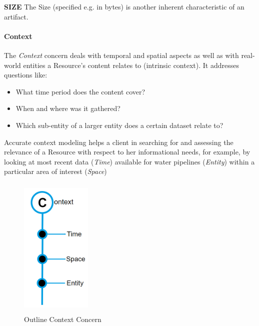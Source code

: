 \textbf{SIZE }The Size (specified e.g. in bytes) is another inherent characteristic of an artifact. 



\paragraph{Context\\}
The \textit{Context} concern deals with temporal and spatial aspects as well as with real-world entities a Resource’s content relates to (intrinsic context). It addresses questions like: 
 \begin{itemize}
	\item What time period does the content cover? 
 	\item When and where was it gathered? 
 	\item Which sub-entity of a larger entity does a certain dataset relate to?
\end{itemize} 
Accurate context modeling helps a client in searching for and assessing the relevance of a Resource with respect to her informational needs, for example, by looking at most recent data (\textit{Time}) available for water pipelines (\textit{Entity}) within a particular area of interest (\textit{Space}) 


\begin{figure}[H]
	\begin{Center}
		\includegraphics[width=1.33in,height=2.68in]{./media/image37.png}
		\caption{Outline Context Concern}
		\label{fig:outline_context_concern}
	\end{Center}
\end{figure} 


